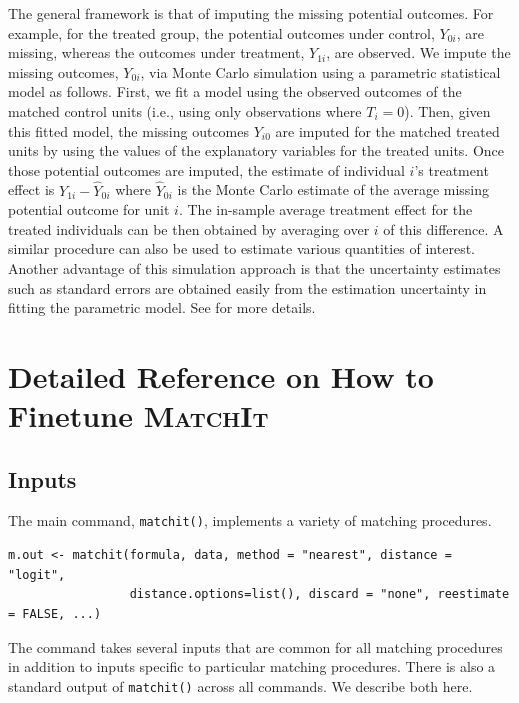 \documentclass[oneside,letterpaper,titlepage]{article}
\newcommand{\MatchIt}{\textsc{MatchIt}}
\begin{document}
The general framework is that of imputing the missing potential
outcomes.  For example, for the treated group, the potential outcomes
under control, $Y_{0i}$, are missing, whereas the outcomes under
treatment, $Y_{1i}$, are observed.  We impute the missing outcomes,
$Y_{0i}$, via Monte Carlo simulation using a parametric statistical
model as follows.  First, we fit a model using the observed outcomes
of the matched control units (i.e., using only observations where
$T_i=0$).  Then, given this fitted model, the missing outcomes
$Y_{i0}$ are imputed for the matched treated units by using the values
of the explanatory variables for the treated units.  Once those
potential outcomes are imputed, the estimate of individual $i$'s
treatment effect is $Y_{1i}-\widehat{Y}_{0i}$ where $\widehat{Y}_{0i}$
is the Monte Carlo estimate of the average missing potential outcome
for unit $i$.  The in-sample average treatment effect for the treated
individuals can be then obtained by averaging over $i$ of this
difference. A similar procedure can also be used to estimate various
quantities of interest. Another advantage of this simulation approach
is that the uncertainty estimates such as standard errors are obtained
easily from the estimation uncertainty in fitting the parametric
model. See \citep{HoImaKin05} for more details.




\section{Detailed Reference on How to Finetune \MatchIt\ }
\label{sec:reference}

\subsection{Inputs}

The main command, \texttt{matchit()}, implements a variety of matching
procedures.
\begin{verbatim}
m.out <- matchit(formula, data, method = "nearest", distance = "logit",
                 distance.options=list(), discard = "none", reestimate = FALSE, ...)
\end{verbatim}
The command takes several inputs that are common for all matching
procedures in addition to inputs specific to particular matching
procedures. There is also a standard output of \texttt{matchit()}
across all commands.  We describe both here.
\end{document}
